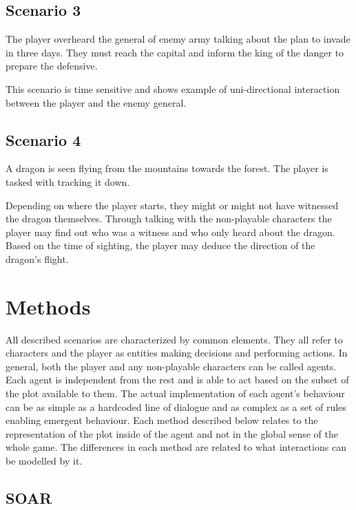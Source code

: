 \subsection{Scenario 3}

The player overheard the general of enemy army talking about the plan to invade in three days.
They must reach the capital and inform the king of the danger to prepare the defensive.

This scenario is time sensitive and shows example of uni-directional interaction between the player and the enemy general.

\subsection{Scenario 4}

A dragon is seen flying from the mountains towards the forest.
The player is tasked with tracking it down.

Depending on where the player starts, they might or might not have witnessed the dragon themselves.
Through talking with the non-playable characters the player may find out who was a witness and who only heard about the dragon.
Based on the time of sighting, the player may deduce the direction of the dragon's flight.


\section{Methods}

All described scenarios are characterized by common elements.
They all refer to characters and the player as entities making decisions and performing actions.
In general, both the player and any non-playable characters can be called agents.
Each agent is independent from the rest and is able to act based on the subset of the plot available to them.
The actual implementation of each agent's behaviour can be as simple as a hardcoded line of dialogue and as complex as a set of rules enabling emergent behaviour.
Each method described below relates to the representation of the plot inside of the agent and not in the global sense of the whole game.
The differences in each method are related to what interactions can be modelled by it.

\subsection{SOAR}


